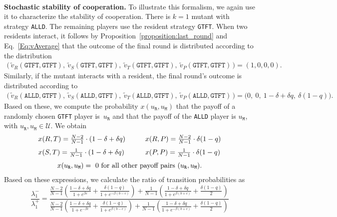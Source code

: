\documentclass[11pt]{article}
\def\alld{\texttt{ALLD}}
\def\gtft{\texttt{GTFT}}
\def\resident{\texttt{R}}
\def\mutant{\texttt{M}}
\theoremstyle{plainCl1}
\theoremstyle{plainCl2}
\begin{document}
~\\
{\bf Stochastic stability of cooperation.}
To illustrate this formalism, we again use it to characterize the stability of cooperation.  
There is $k\!=\!1$ mutant with strategy \alld{}. The remaining players use the resident strategy \gtft. 
When two residents interact, it follows by Proposition~\ref{proposition:last_round} and Eq.~\eqref{Eq:vAverage} that the outcome of the final round is distributed according to the distribution
\begin{align*}
\Big(\, \tilde v_R(\gtft,\gtft),~\tilde v_S(\gtft,\gtft),~ \tilde v_T(\gtft,\gtft),~ \tilde v_P(\gtft,\gtft)\, \Big) = (1,0,0,0). 
\end{align*}
Similarly, if the mutant interacts with a resident, the final round's outcome is distributed according to 
\begin{align*}
\Big(\, \tilde v_R(\alld,\gtft),~\tilde v_S(\alld,\gtft),~ \tilde v_T(\alld,\gtft),~ \tilde v_P(\alld,\gtft)\, \Big) = \big(0,~0,~1\!-\!\delta\!+\!\delta q,~\delta(1\! -\! q)\big). 
\end{align*}
Based on these, we compute the probability $x(u_\resident,u_\mutant)$ that the
payoff of a randomly chosen \gtft{} player is~\(u_\resident\) and that the payoff of the
\alld{} player is \(u_\mutant\), with $u_\resident,u_\mutant \!\in\!\mathcal{U}$. We obtain
\begin{equation*}  \setlength{\arraycolsep}{0.5cm}
\begin{array}{ll}
  x(R, T) =  \frac{N - 2}{N - 1} \cdot (1 - \delta + \delta q)
  &x(R, P) =  \frac{N - 2}{N - 1} \cdot \delta (1 - q) \\[0.25cm]
  x(S, T) =  \frac{1}{N - 1} \cdot (1 - \delta + \delta q) 
  &x(P, P) =  \frac{1}{N - 1} \cdot \delta (1 - q) \\[0.25cm]
  \multicolumn{2}{c}{x(u_\resident, u_\mutant) = ~0 \text{ for all other payoff pairs } (u_\resident, u_\mutant).}
  \end{array}
\end{equation*}
Based on these expressions, we calculate the ratio of transition probabilities as
\begin{equation*}
\frac{\lambda^{-}_1}{\lambda^{+}_1} = \frac{ \frac{N - 2}{N - 1}  
\left(\frac{ 1 - \delta + \delta q}{1+e^{ \beta c} } 
 + \frac{ \delta  \left(1 - q \right)}{1+ e^{-  \beta  \left(b - c \right)}} \right)  
 +  \frac{1}{N-1}  \left(\frac{1 - \delta + \delta q}{1 + e^{\beta  \left( b + c \right)}}
  + \frac{ \delta  \left(1 - q \right)}{2} \right)}
  { \frac{N - 2}{N - 1}  
\left( \frac{ 1 - \delta + \delta q}{1 + e^{-\beta c}}
+  \frac{ \delta  (1 - q)}{1 +e^{  \beta (b - c)}} \right) 
+  \frac{1}{N -1} \left(\frac{ 1 - \delta + \delta q}{1 + e^{-  \beta (b + c)}}
+  \frac{ \delta  \left(1 - q \right)}{2} \right)}
\end{equation*}
\end{document}
